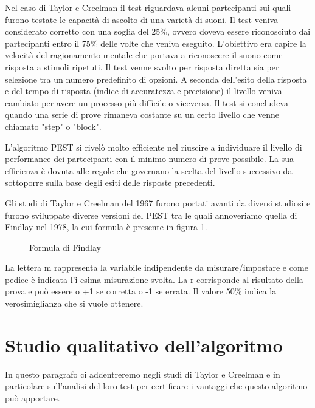 \documentclass[
	corpo=12pt,
	twoside,
 	evenboxes,
	tipotesi=triennale,
    	stile=classica,
   	 greek,
]{toptesi}
\begin{document}
Nel caso di Taylor e Creelman il test riguardava alcuni partecipanti sui quali furono testate le capacità di ascolto di una varietà di suoni. Il test veniva considerato corretto con una soglia del 25\%, ovvero doveva essere riconosciuto dai partecipanti entro il 75\% delle volte che veniva eseguito. L'obiettivo era capire la velocità del ragionamento mentale che portava a riconoscere il suono come risposta a stimoli ripetuti. Il test venne svolto per risposta diretta sia per selezione tra un numero predefinito di opzioni. A seconda dell'esito della risposta e del tempo di risposta (indice di accuratezza e precisione) il livello veniva cambiato per avere un processo più difficile o viceversa. Il test si concludeva quando una serie di prove rimaneva costante su un certo livello che venne chiamato "step" o "block".

L'algoritmo PEST si rivelò molto efficiente nel riuscire a individuare il livello di performance dei partecipanti con il minimo numero di prove possibile. La sua efficienza è dovuta alle regole che governano la scelta del livello successivo da sottoporre sulla base degli esiti delle risposte precedenti.

Gli studi di Taylor e Creelman del 1967 furono portati avanti da diversi studiosi e furono sviluppate diverse versioni del PEST tra le quali annoveriamo quella di Findlay nel 1978, la cui formula è presente in figura \ref{fig:formula_findlay}.

\begin{figure}[H]
\centering
{}
\caption{Formula di Findlay}
\label{fig:formula_findlay}
\end{figure}

La lettera m rappresenta la variabile indipendente da misurare/impostare e come pedice è indicata l'i-esima misurazione svolta. La r corrisponde al risultato della prova e può essere o +1 se corretta o  -1 se errata. Il valore 50\% indica la verosimiglianza che si vuole ottenere.

\section{Studio qualitativo dell'algoritmo}
\label{sec:studioqualitativodellalgoritmo}
In questo paragrafo ci addentreremo negli studi di Taylor e Creelman e in particolare sull'analisi del loro test per certificare i vantaggi che questo algoritmo può apportare.
\end{document}
